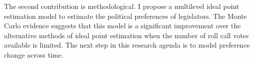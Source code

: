 The second contribution is methodological.  I propose a multilevel ideal point estimation model to estimate the political preferences of legislators. The Monte Carlo evidence suggests that this model is a significant improvement over the alternative methods of ideal point estimation when the number of roll call votes available is limited. The next step in this research agenda is to model preference change across time\citep{martin:2002}.
   






 
  








